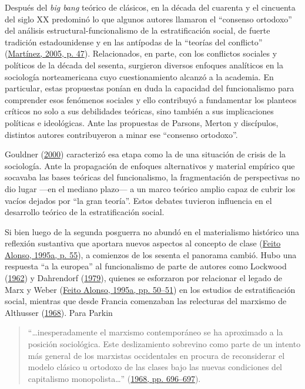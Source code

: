 \documentclass[
]{article}
\begin{document}
Después del \emph{big bang} teórico de clásicos, en la década del cuarenta y el cincuenta del siglo XX predominó lo que algunos autores llamaron el ``consenso ortodoxo'' del análisis estructural-funcionalismo de la estratificación social, de fuerte tradición estadounidense y en las antípodas de la ``teorías del conflicto'' (\protect\hyperlink{ref-Martinez2005}{Martínez, 2005, p. 47}). Relacionados, en parte, con los conflictos sociales y políticos de la década del sesenta, surgieron diversos enfoques analíticos en la sociología norteamericana cuyo cuestionamiento alcanzó a la academia. En particular, estas propuestas ponían en duda la capacidad del funcionalismo para comprender esos fenómenos sociales y ello contribuyó a fundamentar los planteos críticos no solo a sus debilidades teóricas, sino también a sus implicaciones políticas e ideológicas. Ante las propuestas de Parsons, Merton y discípulos, distintos autores contribuyeron a minar ese ``consenso ortodoxo''.

Gouldner (\protect\hyperlink{ref-Gouldner2000}{2000}) caracterizó esa etapa como la de una situación de crisis de la sociología. Ante la propagación de enfoques alternativos y material empírico que socavaba las bases teóricas del funcionalismo, la fragmentación de perspectivas no dio lugar ---en el mediano plazo--- a un marco teórico amplio capaz de cubrir los vacíos dejados por ``la gran teoría''. Estos debates tuvieron influencia en el desarrollo teórico de la estratificación social.

Si bien luego de la segunda posguerra no abundó en el materialismo histórico una reflexión sustantiva que aportara nuevos aspectos al concepto de clase (\protect\hyperlink{ref-FeitoAlonso1995}{Feito Alonso, 1995a, p. 55}), a comienzos de los sesenta el panorama cambió. Hubo una respuesta ``a la europea'' al funcionalismo de parte de autores como Lockwood (\protect\hyperlink{ref-Lockwood1962}{1962}) y Dahrendorf (\protect\hyperlink{ref-Dahrendorf1979}{1979}), quienes se esforzaron por relacionar el legado de Marx y Weber (\protect\hyperlink{ref-FeitoAlonso1995}{Feito Alonso, 1995a, pp. 50--51}) en los estudios de estratificación social, mientras que desde Francia comenzaban las relecturas del marxismo de Althusser (\protect\hyperlink{ref-Althusser1968}{1968}). Para Parkin

\begin{quote}
``\ldots inesperadamente el marxismo contemporáneo se ha aproximado a la posición sociológica. Este deslizamiento sobrevino como parte de un intento más general de los marxistas occidentales en procura de reconsiderar el modelo clásico u ortodoxo de las clases bajo las nuevas condiciones del capitalismo monopolista\ldots{}'' (\protect\hyperlink{ref-Parkin1968}{1968, pp. 696--697}).
\end{quote}
\end{document}
